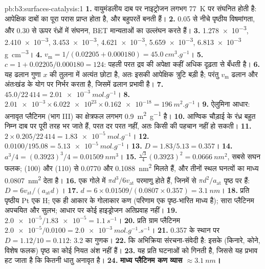 \begin{solution}{pb:b3:surfaces-catalysis:1}
\textbf{1.} वायुमंडलीय दाब पर नाइट्रोजन लगभग \qty{77}{K} पर संघनित होती है: आपेक्षिक दाबों का पूरा परास
प्राप्त होता है, और बहुपरतें बनती हैं।
\textbf{2.} 0.05 से नीचे पृष्ठीय विषमांगता, और 0.30 से ऊपर रंध्रों में
संघनन, BET मान्यताओं का उल्लंघन करते हैं।
\textbf{3.} \num{1.278e-3}, \num{2.410e-3}, \num{3.453e-3}, \num{4.621e-3}, \num{5.659e-3}, \num{6.813e-3} \unit{g.cm^{-3}}।
\textbf{4.} $v_{\mathrm m} = 1/(0.02205 + 0.000180) = \qty{45.0}{cm^3.g^{-1}}$।
\textbf{5.} $c = 1 + 0.02205/0.000180 = 124$: पहली परत द्रव की अपेक्षा कहीं अधिक दृढ़ता से
बँधती है।
\textbf{6.} यह ढलान गुणा $x$ की तुलना में अत्यंत छोटा है, अतः इसकी आपेक्षिक त्रुटि बड़ी है;
परंतु $v_{\mathrm m}$ ढलान और अंतःखंड के योग पर निर्भर करता है, जिसमें ढलान प्रभावी है।
\textbf{7.} $45.0/22\,414 = \qty{2.01e-3}{mol.g^{-1}}$।
\textbf{8.} $\num{2.01e-3} \times \num{6.022e23} \times \num{0.162e-18} = \qty{196}{m^2.g^{-1}}$।
\textbf{9.} ऐलुमिना आधार: अनावृत प्लैटिनम (भाग III) का क्षेत्रफल लगभग \qty{0.9}{m^2.g^{-1}} है।
\textbf{10.} आण्विक चौड़ाई के रंध्र बहुत निम्न दाब पर पूरी तरह भर जाते हैं, परत
दर परत नहीं, अतः किसी  की पहचान नहीं हो सकती।
\textbf{11.} $2 \times 0.205/22\,414 = \qty{1.83e-5}{mol.g^{-1}}$।
\textbf{12.} $0.0100/195.08 = \qty{5.13e-5}{mol.g^{-1}}$।
\textbf{13.} $D = 1.83/5.13 = 0.357$।
\textbf{14.} $a^3/4 = (0.3923)^3/4 = \qty{0.01509}{nm^3}$।
\textbf{15.} $\frac{\sqrt3}{4}(0.3923)^2 = \qty{0.0666}{nm^2}$, सबसे सघन फलक; (100) और (110) से 0.0770 और
\qty{0.1088}{nm^2} मिलते हैं, और तीनों स्थल घनत्वों का माध्य \qty{0.0807}{nm^2} देता है।
\textbf{16.} एक गोले में $\pi d^3/6v_{\mathrm{at}}$ परमाणु होते हैं, जिनमें से $\pi d^2/a_{\mathrm{at}}$ पृष्ठ पर हैं:
$D = 6v_{\mathrm{at}}/(a_{\mathrm{at}}d)$।
\textbf{17.} $d = 6 \times 0.01509/(0.0807 \times 0.357) = \qty{3.1}{nm}$।
\textbf{18.} प्रति पृष्ठीय Pt एक H; एक ही आकार के गोलाकार कण (परिणाम एक
पृष्ठ-भारित माध्य है); सारा प्लैटिनम अपचयित और सुलभ; आधार पर कोई हाइड्रोजन
अतिप्रवाह नहीं।
\textbf{19.} $\num{2.0e-5}/\num{1.83e-5} = \qty{1.1}{s^{-1}}$।
\textbf{20.} प्रति ग्राम प्लैटिनम $\num{2.0e-5}/0.0100 = \qty{2.0e-3}{mol.g^{-1}.s^{-1}}$।
\textbf{21.} 0.357 के स्थान पर $D = 1.12/10 = 0.112$: 3.2 का गुणक।
\textbf{22.} कि अभिक्रिया संरचना-संवेदी है: इसके  (किनारे,
कोने, विशेष फलक) पृष्ठ का कोई नियत अंश नहीं हैं।
\textbf{23.} यह प्रति  घटनाओं को गिनती है, जिससे यह प्रभाव हट जाता है कि कितनी
धातु अनावृत है।
\textbf{24.} \textbf{माध्य प्लैटिनम कण व्यास $\approx \qty{3.1}{nm}$।}
\end{solution}
